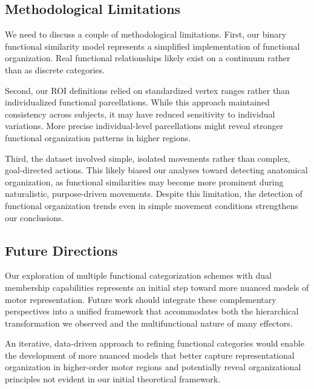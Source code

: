 \documentclass{article}
\begin{document}
\subsection{Methodological Limitations}

We need to discuss a couple of methodological limitations. First, our binary functional similarity model represents a simplified implementation of functional organization. Real functional relationships likely exist on a continuum rather than as discrete categories.

Second, our ROI definitions relied on standardized vertex ranges rather than individualized functional parcellations. While this approach maintained consistency across subjects, it may have reduced sensitivity to individual variations. More precise individual-level parcellations might reveal stronger functional organization patterns in higher regions.

Third, the dataset involved simple, isolated movements rather than complex, goal-directed actions. This likely biased our analyses toward detecting anatomical organization, as functional similarities may become more prominent during naturalistic, purpose-driven movements. Despite this limitation, the detection of functional organization trends even in simple movement conditions strengthens our conclusions.

\subsection{Future Directions}

Our exploration of multiple functional categorization schemes with dual membership capabilities represents an initial step toward more nuanced models of motor representation. Future work should integrate these complementary perspectives into a unified framework that accommodates both the hierarchical transformation we observed and the multifunctional nature of many effectors.

An iterative, data-driven approach to refining functional categories would enable the development of more nuanced models that better capture representational organization in higher-order motor regions and potentially reveal organizational principles not evident in our initial theoretical framework.


\end{document}

